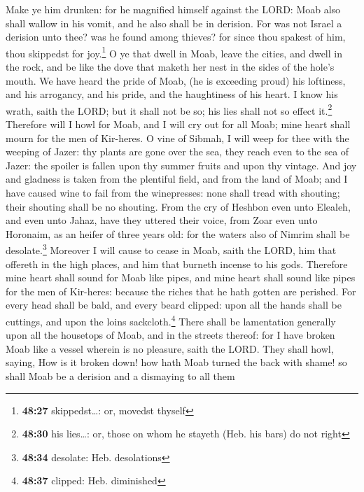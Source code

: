  Make ye him drunken: for he magnified himself against
the LORD: Moab also shall wallow in his vomit, and he also shall be in
derision.  For was not Israel a derision unto thee? was
he found among thieves? for since thou spakest of him, thou skippedst
for joy.\footnote{\textbf{48:27} skippedst\ldots: or, movedst thyself}
 O ye that dwell in Moab, leave the cities, and dwell in
the rock, and be like the dove that maketh her nest in the sides of the
hole's mouth.  We have heard the pride of Moab, (he is
exceeding proud) his loftiness, and his arrogancy, and his pride, and
the haughtiness of his heart.  I know his wrath, saith
the LORD; but it shall not be so; his lies shall not so effect
it.\footnote{\textbf{48:30} his lies\ldots: or, those on whom he stayeth
  (Heb. his bars) do not right}  Therefore will I howl
for Moab, and I will cry out for all Moab; mine heart shall mourn for
the men of Kir-heres.  O vine of Sibmah, I will weep for
thee with the weeping of Jazer: thy plants are gone over the sea, they
reach even to the sea of Jazer: the spoiler is fallen upon thy summer
fruits and upon thy vintage.  And joy and gladness is
taken from the plentiful field, and from the land of Moab; and I have
caused wine to fail from the winepresses: none shall tread with
shouting; their shouting shall be no shouting.  From the
cry of Heshbon even unto Elealeh, and even unto Jahaz, have they uttered
their voice, from Zoar even unto Horonaim, as an heifer of three years
old: for the waters also of Nimrim shall be desolate.\footnote{\textbf{48:34}
  desolate: Heb. desolations}  Moreover I will cause to
cease in Moab, saith the LORD, him that offereth in the high places, and
him that burneth incense to his gods.  Therefore mine
heart shall sound for Moab like pipes, and mine heart shall sound like
pipes for the men of Kir-heres: because the riches that he hath gotten
are perished.  For every head shall be bald, and every
beard clipped: upon all the hands shall be cuttings, and upon the loins
sackcloth.\footnote{\textbf{48:37} clipped: Heb. diminished}
 There shall be lamentation generally upon all the
housetops of Moab, and in the streets thereof: for I have broken Moab
like a vessel wherein is no pleasure, saith the LORD. 
They shall howl, saying, How is it broken down! how hath Moab turned the
back with shame! so shall Moab be a derision and a dismaying to all them
